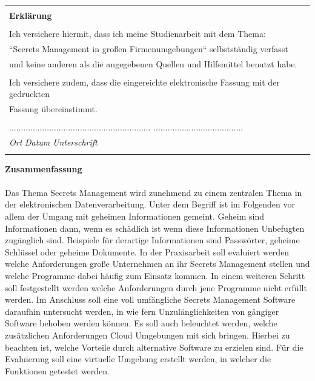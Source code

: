 \documentclass[
a4paper,   
titlepage,  
halfparskip,
12pt        
]{scrartcl}
\begin{document}
\thispagestyle{empty}

\begin{table}[h]
\centering
  \begin{tabular}{| l |}
  \hline
  \\
  \textbf{Erklärung} \\
  \\
  Ich versichere hiermit, dass ich meine Studienarbeit mit dem Thema: \\
  ``Secrets Management in großen Firmenumgebungen`` selbstständig verfasst \\
  und keine anderen als die angegebenen Quellen und Hilfsmittel benutzt habe. \\
  \\
  Ich versichere zudem, dass die eingereichte elektronische Fassung mit der gedruckten \\
  Fassung übereinstimmt. \\ \\
  ............................................................\hspace{0.5cm} ......................................\\
  \textit{Ort} \hspace{1cm} \textit{Datum} \hspace{4.2cm} \textit{Unterschrift}\\
  \\
  \hline
  \end{tabular}
\end{table}
\newpage

\thispagestyle{empty}

\large{\textbf{Zusammenfassung}}\\
\\
Das Thema Secrets Management wird zunehmend zu einem zentralen Thema in der
elektronischen Datenverarbeitung.  Unter dem Begriff ist im Folgenden vor
allem der Umgang mit geheimen Informationen gemeint.  Geheim sind
Informationen dann, wenn es schädlich ist wenn diese Informationen
Unbefugten zugänglich sind. Beispiele für derartige Informationen sind
Passwörter, geheime Schlüssel oder geheime Dokumente.  In der
Praxisarbeit soll evaluiert werden welche Anforderungen große Unternehmen
an ihr Secrets Management stellen und welche Programme dabei häufig zum
Einsatz kommen.  In einem weiteren Schritt soll festgestellt werden welche
Anforderungen durch jene Programme nicht erfüllt werden.  Im Anschluss
soll eine voll umfängliche Secrets Management Software daraufhin untersucht
werden, in wie fern Unzulänglichkeiten von gängiger Software behoben
werden können.  Es soll auch beleuchtet werden, welche zusätzlichen
Anforderungen Cloud Umgebungen mit sich bringen.  Hierbei zu beachten ist,
welche Vorteile durch alternative Software zu erzielen sind.  Für die
Evaluierung soll eine virtuelle Umgebung erstellt werden, in welcher die
Funktionen getestet werden.
\newpage
\thispagestyle{empty}
\end{document}
